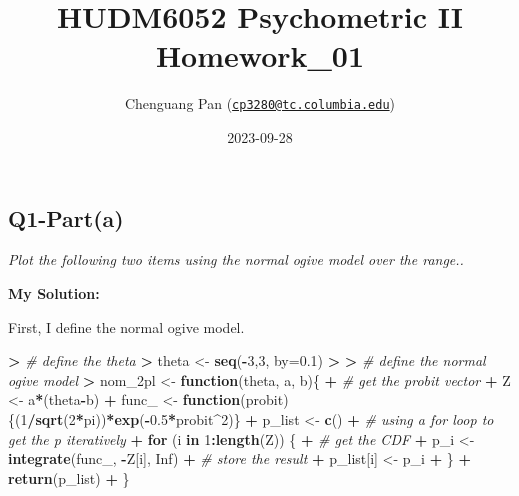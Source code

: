 \documentclass[
]{article}
\title{HUDM6052 Psychometric II Homework\_01}
\author{Chenguang Pan
(\href{mailto:cp3280@tc.columbia.edu}{\nolinkurl{cp3280@tc.columbia.edu}})}
\date{2023-09-28}
\newenvironment{Shaded}{\begin{snugshade}}{\end{snugshade}}
\newcommand{\AttributeTok}[1]{\textcolor[rgb]{0.13,0.29,0.53}{#1}}
\newcommand{\CommentTok}[1]{\textcolor[rgb]{0.56,0.35,0.01}{\textit{#1}}}
\newcommand{\ConstantTok}[1]{\textcolor[rgb]{0.56,0.35,0.01}{#1}}
\newcommand{\ControlFlowTok}[1]{\textcolor[rgb]{0.13,0.29,0.53}{\textbf{#1}}}
\newcommand{\DecValTok}[1]{\textcolor[rgb]{0.00,0.00,0.81}{#1}}
\newcommand{\ErrorTok}[1]{\textcolor[rgb]{0.64,0.00,0.00}{\textbf{#1}}}
\newcommand{\FloatTok}[1]{\textcolor[rgb]{0.00,0.00,0.81}{#1}}
\newcommand{\FunctionTok}[1]{\textcolor[rgb]{0.13,0.29,0.53}{\textbf{#1}}}
\newcommand{\NormalTok}[1]{#1}
\newcommand{\OtherTok}[1]{\textcolor[rgb]{0.56,0.35,0.01}{#1}}
\newcommand{\SpecialCharTok}[1]{\textcolor[rgb]{0.81,0.36,0.00}{\textbf{#1}}}
\begin{document}
\maketitle

\setcounter{tocdepth}{4}
\tableofcontents

\hypertarget{q1-parta}{%
\subsection{Q1-Part(a)}\label{q1-parta}}

\emph{Plot the following two items using the normal ogive model over the
range..}

\textbf{My Solution: }

First, I define the normal ogive model.

\begin{Shaded}
\begin{Highlighting}[]
\SpecialCharTok{\textgreater{}} \CommentTok{\# define the theta}
\ErrorTok{\textgreater{}}\NormalTok{ theta }\OtherTok{\textless{}{-}} \FunctionTok{seq}\NormalTok{(}\SpecialCharTok{{-}}\DecValTok{3}\NormalTok{,}\DecValTok{3}\NormalTok{, }\AttributeTok{by=}\FloatTok{0.1}\NormalTok{)}
\SpecialCharTok{\textgreater{}} 
\ErrorTok{\textgreater{}} \CommentTok{\# define the normal ogive model}
\ErrorTok{\textgreater{}}\NormalTok{ nom\_2pl }\OtherTok{\textless{}{-}} \ControlFlowTok{function}\NormalTok{(theta, a, b)\{}
\SpecialCharTok{+}   \CommentTok{\# get the probit vector}
\SpecialCharTok{+}\NormalTok{   Z }\OtherTok{\textless{}{-}}\NormalTok{ a}\SpecialCharTok{*}\NormalTok{(theta}\SpecialCharTok{{-}}\NormalTok{b)}
\SpecialCharTok{+}\NormalTok{   func\_ }\OtherTok{\textless{}{-}} \ControlFlowTok{function}\NormalTok{(probit)\{(}\DecValTok{1}\SpecialCharTok{/}\FunctionTok{sqrt}\NormalTok{(}\DecValTok{2}\SpecialCharTok{*}\NormalTok{pi))}\SpecialCharTok{*}\FunctionTok{exp}\NormalTok{(}\SpecialCharTok{{-}}\FloatTok{0.5}\SpecialCharTok{*}\NormalTok{probit}\SpecialCharTok{\^{}}\DecValTok{2}\NormalTok{)\}}
\SpecialCharTok{+}\NormalTok{   p\_list }\OtherTok{\textless{}{-}} \FunctionTok{c}\NormalTok{()}
\SpecialCharTok{+}   \CommentTok{\# using a for loop to get the p iteratively}
\SpecialCharTok{+}   \ControlFlowTok{for}\NormalTok{ (i }\ControlFlowTok{in} \DecValTok{1}\SpecialCharTok{:}\FunctionTok{length}\NormalTok{(Z)) \{}
\SpecialCharTok{+}     \CommentTok{\# get the CDF}
\SpecialCharTok{+}\NormalTok{     p\_i }\OtherTok{\textless{}{-}} \FunctionTok{integrate}\NormalTok{(func\_, }\SpecialCharTok{{-}}\NormalTok{Z[i], }\ConstantTok{Inf}\NormalTok{)}
\SpecialCharTok{+}     \CommentTok{\# store the result}
\SpecialCharTok{+}\NormalTok{     p\_list[i] }\OtherTok{\textless{}{-}}\NormalTok{ p\_i}
\SpecialCharTok{+}\NormalTok{   \}}
\SpecialCharTok{+}   \FunctionTok{return}\NormalTok{(p\_list)}
\SpecialCharTok{+}\NormalTok{ \}}
\end{Highlighting}
\end{Shaded}
\end{document}
